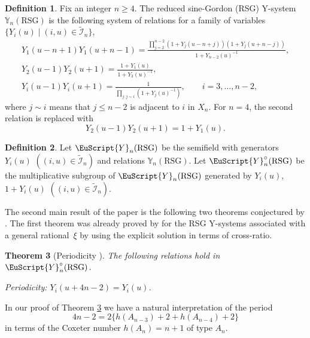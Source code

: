 \documentclass[pdftex]{sigma}
\numberwithin{equation}{section}
\newtheorem{Theorem}{Theorem}[section]
\theoremstyle{definition}
\newtheorem{Definition}[Theorem]{Definition}
\begin{document}
\begin{Definition}
\label{def:RSGY}
Fix an integer $n \geq 4$.
The reduced sine-Gordon (RSG)
Y-system $\mathbb{Y}_{n}(\mathrm{RSG})$
is the following system of relations for
a family of variables
 $\{Y_i(u) \mid (i,u)\in \tilde{\mathcal{I}}_n \}$,
\begin{gather}
Y_1\left(u-n+1\right)
Y_1\left(u+n-1\right)
=
\frac{\prod\limits_{j=2}^{n-2}(1+Y_j(u-n+j))(1+Y_j(u+n-j))
}
{
1+Y_{n-2}(u)^{-1}
},
\nonumber\\
Y_2(u-1) Y_2(u+1)
=
\frac{1+Y_1(u)}{1+Y_3(u)^{-1}},\nonumber\\
Y_i(u-1)Y_i(u+1)
=
\frac{1}
{\prod\limits_{j:j\sim i} (1+Y_j(u)^{-1})
},
\qquad i=3,\dots,n-2,\label{eq:Y1r}
\end{gather}
where $j\sim i$ means that $j \leq n-2$ is adjacent to $i$ in $X_n$.
For $n=4$, the second relation is replaced with
\[
Y_2(u-1) Y_2(u+1)
= 1+Y_1(u).
\]
\end{Definition}


\begin{Definition}
\label{def:YCr}
Let $\EuScript{Y}_{n}(\mathrm{RSG})$
be the semif\/ield with generators
$Y_i(u)$
 $((i,u)\in \tilde{\mathcal{I}}_{n})$
and relations $\mathbb{Y}_{n}(\mathrm{RSG})$.
Let $\EuScript{Y}^{\circ}_{n}(\mathrm{RSG})$
be the multiplicative subgroup
of $\EuScript{Y}_{n}(\mathrm{RSG})$
generated by
$Y_i(u)$, $1+Y_i(u)$
 $((i,u)\in \tilde{\mathcal{I}}_{n})$.
\end{Definition}

The second main result of the paper is
the following two theorems conjectured by
\cite{Tateo95}.
The f\/irst theorem was already proved by \cite{Gliozzi95}
for the RSG Y-systems associated with
a general rational~$\xi$ by using the explicit solution
in terms of cross-ratio.

\begin{Theorem}[{Periodicity \cite{Gliozzi95}}]
\label{thm:Yperiodr}
The following relations hold in $\EuScript{Y}^{\circ}_{n}(\mathrm{RSG})$.

Periodicity: $Y_i(u+4n-2)=Y_i(u)$.
\end{Theorem}

In our proof of Theorem \ref{thm:Yperiodr}
we have  a natural interpretation
of the  period
\[
4n-2=2\{h(A_{n-3})+2+h(A_{n-4})+2\}
\]
in terms of the Coxeter number  $h(A_n)=n+1$ of type $A_n$.
\end{document}
